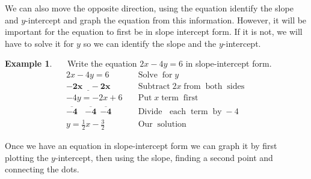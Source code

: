 \documentclass[12pt]{book}
\theoremstyle{definition}
\newtheorem{example}{Example}
\newcommand{\tmmathbf}[1]{\ensuremath{\boldsymbol{#1}}}
\newcommand{\tmop}[1]{\ensuremath{\operatorname{#1}}}
\begin{document}
We can also move the opposite direction, using the equation identify the slope and $y$-intercept and graph the equation from this information. However, it will be important for the equation to first be in slope intercept form. If it is not, we will have to solve it for $y$ so we can identify the slope and the $y$-intercept.
\begin{example}\label{Lin58}~~~Write the equation $2x-4y=6$ in slope-intercept form.
  \begin{eqnarray*}
    2 x - 4 y = 6~~ &  & \tmop{Solve} \tmop{for} y\\
    \tmmathbf{\underline{- 2 x ~~~~- 2 x}} &  & \tmop{Subtract} 2 x \tmop{from} \tmop{both}
    \tmop{sides}\\
    - 4 y = - 2 x + 6 &  & \tmop{Put} x \tmop{term} \tmop{first}\\
    \tmmathbf{\overline{- 4} ~~~~ \overline{- 4} ~~ \overline{- 4}} &  & \tmop{Divide~}
    \tmop{each} \tmop{term} \tmop{by} - 4\\
    y = \frac{1}{2} x - \frac{3}{2} &  & \tmop{Our} \tmop{solution}
  \end{eqnarray*}
\end{example}
Once we have an equation in slope-intercept form we can graph it by first plotting the $y$-intercept, then using the slope, finding a second point and connecting the dots.
\end{document}
